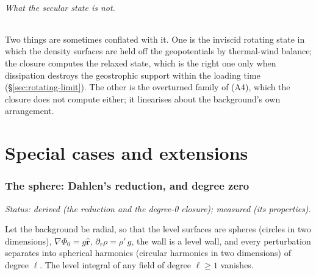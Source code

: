 \documentclass[11pt]{article}
\theoremstyle{definition}
\theoremstyle{remark}
\newcommand{\status}[1]{\noindent\emph{Status: #1}\par\smallskip}
\begin{document}
\paragraph{What the secular state is not.} Two things are sometimes
conflated with it. One is the inviscid rotating state in which the
density surfaces are held off the geopotentials by thermal-wind
balance; the closure computes the relaxed state, which is the right one
only when dissipation destroys the geostrophic support within the
loading time (\S\ref{sec:rotating-limit}). The other is the overturned
family of (A4), which the closure does not compute either; it
linearises about the background's own arrangement.

\part{Special cases and extensions}

\section{The sphere: Dahlen's reduction, and degree zero}
\label{sec:dahlen}
\label{sec:sphere}

\status{derived (the reduction and the degree-0 closure); measured (its
properties).}

Let the background be radial, so that the level surfaces are spheres
(circles in two dimensions), $\nabla\Phi_0 = g\hat{\mathbf r}$,
$\partial_r\rho = \rho'\,g$, the wall is a level wall, and every
perturbation separates into spherical harmonics (circular harmonics in
two dimensions) of degree $\ell$. The level integral of any field of
degree $\ell \ge 1$ vanishes.
\end{document}
